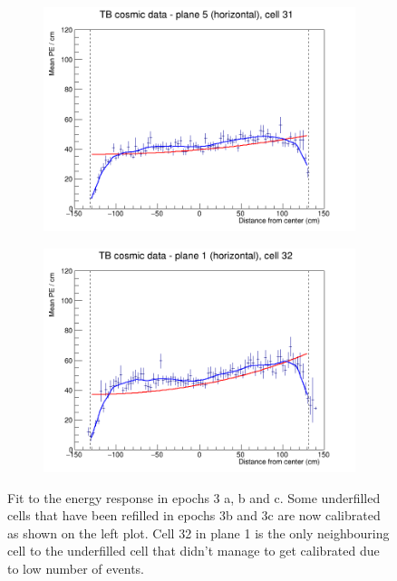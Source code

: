 \documentclass[12pt,a4paper]{article}
\begin{document}
\begin{figure}[h]
  \begin{subfigure}{0.5\textwidth}
    \includegraphics[width=\linewidth]{RelativeCalibrationResults/ep3abc_005_031.png}
  \end{subfigure}
  \begin{subfigure}{0.5\textwidth}
    \includegraphics[width=\linewidth]{RelativeCalibrationResults/ep3abc_001_032.png}
  \end{subfigure}
  \caption{Fit to the energy response in epochs 3 a, b and c. Some underfilled cells that have been refilled in epochs 3b and 3c are now calibrated as shown on the left plot. Cell 32 in plane 1 is the only neighbouring cell to the underfilled cell that didn't manage to get calibrated due to low number of events.}
  \label{figAttenfitResultsEpoch3abc_UnderfilledCellsNeighbours}
\end{figure}
\end{document}
